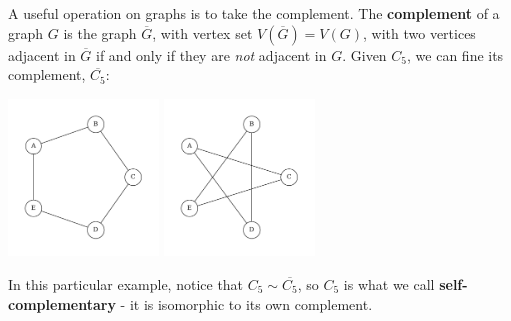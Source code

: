 A useful operation on graphs is to take the complement. The \textbf{complement} of a graph $G$ is the graph $\overline{G}$, with vertex set $V(\overline{G}) = V(G)$, with two vertices adjacent in $\overline{G}$ if and only if they are \emph{not} adjacent in $G$. Given $C_5$, we can fine its complement, $\overline{C_5}$:
\begin{center}
    \includegraphics[width=0.3\textwidth]{Chapter2/c5.pdf}
    \includegraphics[width=0.3\textwidth]{Chapter2/c5comp.pdf}
\end{center}
In this particular example, notice that $C_5 \sim \overline{C_5}$, so $C_5$ is what we call \textbf{self-complementary} - it is isomorphic to its own complement.

